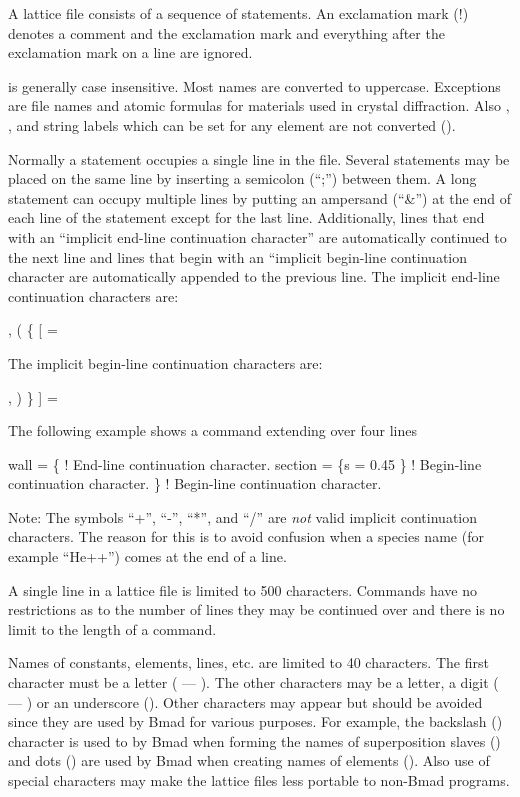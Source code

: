 A \bmad lattice file consists of a sequence of statements. An exclamation mark (!) denotes a comment
and the exclamation mark and everything after the exclamation mark on a line are ignored.  

\bmad is generally case insensitive. Most names are converted to uppercase. Exceptions are 
file names and atomic formulas for materials used in crystal diffraction. Also , ,
and  string labels which can be set for any element are not converted ().

Normally a statement occupies a single line in the file. Several statements may be placed on the
same line by inserting a semicolon (``;'') between them. A long statement can occupy multiple lines
by putting an ampersand (``\&'') at the end of each line of the statement except for the last
line. Additionally, lines that end with an ``implicit end-line continuation character'' are automatically
continued to the next line and lines that begin with an ``implicit begin-line continuation character are
automatically appended to the previous line. The implicit end-line continuation characters are:
\begin{example}
  ,   (   \{   [   =
\end{example}
The implicit begin-line continuation characters are:
\begin{example}
  ,   )   \}   ]   =
\end{example}
The following example shows a command extending over four lines
\begin{example}
  wall = \{               ! End-line continuation character.
    section = \{s = 0.45 
    \}                    ! Begin-line continuation character.
  \}                      ! Begin-line continuation character.
\end{example}
Note: The symbols ``+'', ``-'', ``*'', and ``/'' are {\em not} valid implicit continuation
characters. The reason for this is to avoid confusion when a species name (for example ``He++'')
comes at the end of a line.

A single line in a lattice file is limited to 500 characters. Commands have no restrictions as to
the number of lines they may be continued over and there is no limit to the length of a command.

Names of constants, elements, lines, etc. are limited to 40 characters. The first character must be
a letter ( --- ).  The other characters may be a letter, a digit ( --- ) or
an underscore (\vn{_}). Other characters may appear but should be avoided since they are used by
Bmad for various purposes. For example, the backslash (\vn{\B}) character is used to by Bmad when
forming the names of superposition slaves () and dots () are used by Bmad when
creating names of  elements (). Also use of special characters may make the
lattice files less portable to non-Bmad programs.


